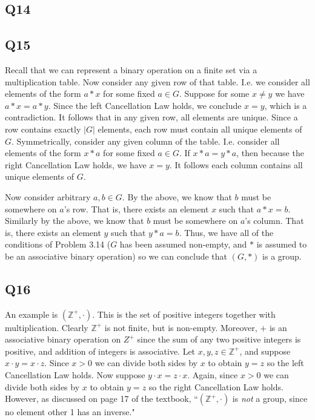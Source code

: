\documentclass[12pt]{article}
\def\Z{{\mathbb Z}}        %
\numberwithin{theorem}{section}
\numberwithin{equation}{section}
\numberwithin{remark}{section}
\numberwithin{definition}{section}
\numberwithin{theorem}{section}
\numberwithin{lemma}{section}
\numberwithin{example}{section}
\begin{document}
\subsection{Q14}

\subsection{Q15}

Recall that we can represent a binary operation on a finite set via a multiplication table. Now consider any given row of that table. I.e. we consider all elements of the form $a*x$ for some fixed $a\in G$. Suppose for some $x\neq y$ we have $a*x=a*y$. Since the left Cancellation Law holds, we conclude $x=y$, which is a contradiction. It follows that in any given row, all elements are unique. Since a row contains exactly $|G|$ elements, each row must contain all unique elements of $G$. Symmetrically, consider any given column of the table. I.e. consider all elements of the form $x*a$ for some fixed $a\in G$. If $x*a=y*a$, then because the right Cancellation Law holds, we have $x=y$. It follows each column contains all unique elements of $G$.

Now consider arbitrary $a,b\in G$. By the above, we know that $b$ must be somewhere on $a$'s row. That is, there exists an element $x$ such that $a*x=b$. Similarly by the above, we know that $b$ must be somewhere on $a$'s column. That is, there exists an element $y$ such that $y*a=b$. Thus, we have all of the conditions of Problem 3.14 ($G$ has been assumed non-empty, and $*$ is assumed to be an associative binary operation) so we can conclude that $(G,*)$ is a group. 


\subsection{Q16}

An example is $(\Z^{+},\cdot)$. This is the set of positive integers together with multiplication. Clearly $\Z^{+}$ is not finite, but is non-empty. Moreover, $+$ is an associative binary operation on $Z^+$ since the sum of any two positive integers is positive, and addition of integers is associative. Let $x,y,z\in\Z^{+}$, and suppose $x\cdot y = x\cdot z$. Since $x>0$ we can divide both sides by $x$ to obtain $y=z$ so the left Cancellation Law holds. Now suppose $y\cdot x = z\cdot x$. Again, since $x>0$ we can divide both sides by $x$ to obtain $y=z$ so the right Cancellation Law holds. However, as discussed on page 17 of the textbook, ``$(\Z^{+},\cdot)$ is \emph{not} a group, since no element other 1 has an inverse."
\end{document}
